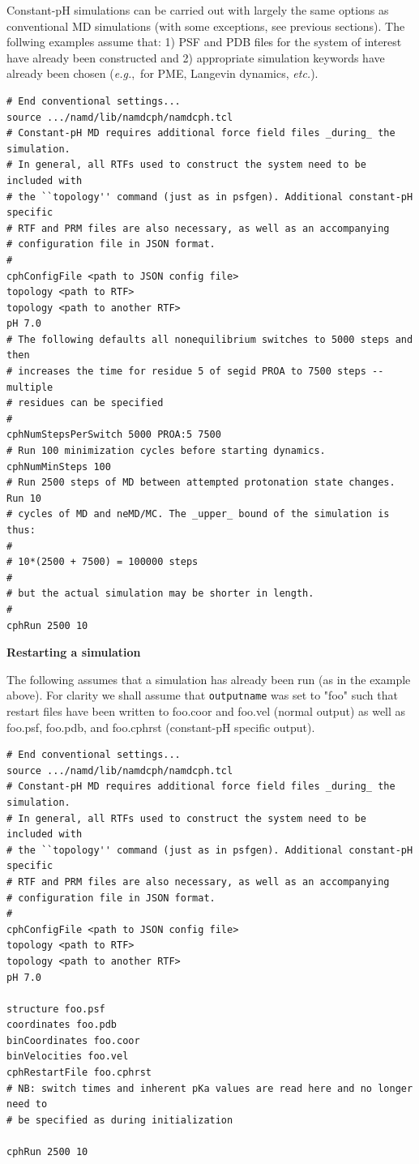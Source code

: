 Constant-pH simulations can be carried out with largely the same options as
  conventional MD simulations (with some exceptions, see previous sections).
The follwing examples assume that: 1) PSF and PDB files for the
  system of interest have already been constructed and 2) appropriate
  simulation keywords have already been chosen (\textit{e.g.},~for PME,
  Langevin dynamics, \textit{etc.}).
\begin{verbatim}
# End conventional settings...
source .../namd/lib/namdcph/namdcph.tcl
# Constant-pH MD requires additional force field files _during_ the simulation.
# In general, all RTFs used to construct the system need to be included with
# the ``topology'' command (just as in psfgen). Additional constant-pH specific
# RTF and PRM files are also necessary, as well as an accompanying
# configuration file in JSON format.
#
cphConfigFile <path to JSON config file>
topology <path to RTF>
topology <path to another RTF>
pH 7.0
# The following defaults all nonequilibrium switches to 5000 steps and then
# increases the time for residue 5 of segid PROA to 7500 steps -- multiple
# residues can be specified 
#
cphNumStepsPerSwitch 5000 PROA:5 7500
# Run 100 minimization cycles before starting dynamics.
cphNumMinSteps 100
# Run 2500 steps of MD between attempted protonation state changes. Run 10
# cycles of MD and neMD/MC. The _upper_ bound of the simulation is thus:
#
# 10*(2500 + 7500) = 100000 steps
#
# but the actual simulation may be shorter in length.
#
cphRun 2500 10
\end{verbatim}

\newpage
\noindent
\textbf{Restarting a simulation}

\noindent
The following assumes that a simulation has already been run (as in the example
  above).
For clarity we shall assume that \texttt{outputname} was set to "foo" such that
  restart files have been written to foo.coor and foo.vel (normal output) as
  well as foo.psf, foo.pdb, and foo.cphrst (constant-pH specific output).

\begin{verbatim}
# End conventional settings...
source .../namd/lib/namdcph/namdcph.tcl
# Constant-pH MD requires additional force field files _during_ the simulation.
# In general, all RTFs used to construct the system need to be included with
# the ``topology'' command (just as in psfgen). Additional constant-pH specific
# RTF and PRM files are also necessary, as well as an accompanying
# configuration file in JSON format.
#
cphConfigFile <path to JSON config file>
topology <path to RTF>
topology <path to another RTF>
pH 7.0

structure foo.psf
coordinates foo.pdb
binCoordinates foo.coor
binVelocities foo.vel
cphRestartFile foo.cphrst
# NB: switch times and inherent pKa values are read here and no longer need to
# be specified as during initialization

cphRun 2500 10
\end{verbatim}

